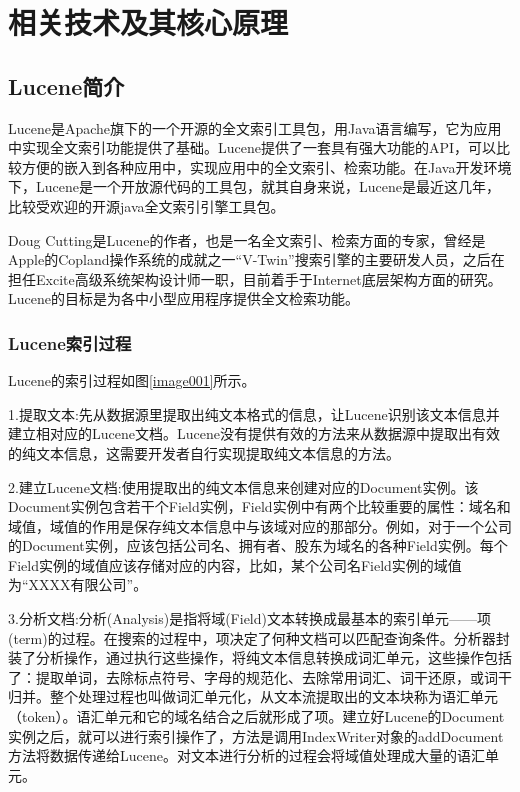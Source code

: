 
\chapter{相关技术及其核心原理}
\section{Lucene简介}

Lucene是Apache旗下的一个开源的全文索引工具包，用Java语言编写，它为应用中实现全文索引功能提供了基础。Lucene提供了一套具有强大功能的API，可以比较方便的嵌入到各种应用中，实现应用中的全文索引、检索功能。在Java开发环境下，Lucene是一个开放源代码的工具包，就其自身来说，Lucene是最近这几年，比较受欢迎的开源java全文索引引擎工具包。

Doug Cutting是Lucene的作者，也是一名全文索引、检索方面的专家，曾经是Apple的Copland操作系统的成就之一“V-Twin”搜索引擎的主要研发人员，之后在担任Excite高级系统架构设计师一职，目前着手于Internet底层架构方面的研究。Lucene的目标是为各中小型应用程序提供全文检索功能。

\subsection{Lucene索引过程}
Lucene的索引过程如图\ref{image001}所示。

1.提取文本:先从数据源里提取出纯文本格式的信息，让Lucene识别该文本信息并建立相对应的Lucene文档。Lucene没有提供有效的方法来从数据源中提取出有效的纯文本信息，这需要开发者自行实现提取纯文本信息的方法。

2.建立Lucene文档:使用提取出的纯文本信息来创建对应的Document实例。该\\Document实例包含若干个Field实例，Field实例中有两个比较重要的属性：域名和域值，域值的作用是保存纯文本信息中与该域对应的那部分。例如，对于一个公司的Document实例，应该包括公司名、拥有者、股东为域名的各种Field实例。每个Field实例的域值应该存储对应的内容，比如，某个公司名Field实例的域值为“XXXX有限公司”。

3.分析文档:分析(Analysis)是指将域(Field)文本转换成最基本的索引单元——项(term)的过程。在搜索的过程中，项决定了何种文档可以匹配查询条件。分析器封装了分析操作，通过执行这些操作，将纯文本信息转换成词汇单元，这些操作包括了：提取单词，去除标点符号、字母的规范化、去除常用词汇、词干还原，或词干归并。整个处理过程也叫做词汇单元化，从文本流提取出的文本块称为语汇单元（token）。语汇单元和它的域名结合之后就形成了项。建立好Lucene的Document实例之后，就可以进行索引操作了，方法是调用IndexWriter对象的addDocument方法将数据传递给Lucene。对文本进行分析的过程会将域值处理成大量的语汇单元。

